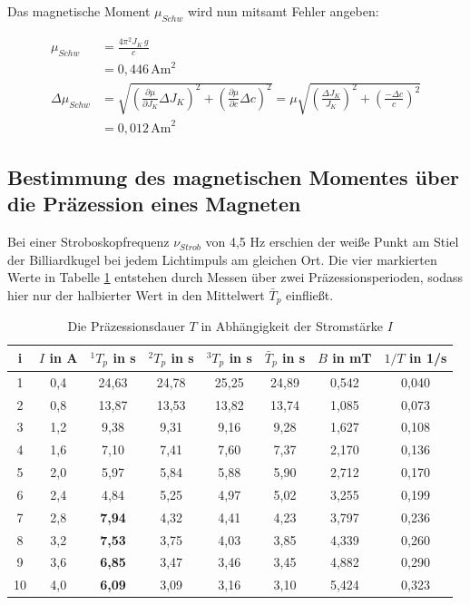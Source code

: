 Das magnetische Moment $\mu_{Schw}$ wird nun mitsamt Fehler angeben:

\begin{align}
 \nonumber
 \mu_{Schw} &= \frac{4 \pi^2 J_{K}\,g}{c} \\
 &= 0,446\, \text{Am}^2\\
 \nonumber
 \Delta \mu_{Schw} &= \sqrt{\left(\frac{\partial \mu}{\partial J_{K}}\Delta J_{K} \right)^2 + \left(\frac{\partial \mu}{\partial c}\Delta c \right)^2} = \mu \sqrt{\left( \frac{\Delta J_{K}}{J_{K}}\right)^2 + \left( \frac{-\Delta c}{c}\right)^2}\\
 &= 0,012 \, \text{Am}^2
\end{align}

\subsection[Ermittlung durch Präzission]{Bestimmung des magnetischen Momentes über die Präzession eines Magneten}
Bei einer Stroboskopfrequenz $\nu_{Strob}$ von 4,5 Hz erschien der weiße Punkt am Stiel der Billiardkugel bei jedem Lichtimpuls
am gleichen Ort. Die vier markierten Werte in Tabelle \ref{tabpräz} entstehen durch Messen über zwei Präzessionsperioden, sodass hier nur
der halbierter Wert in den Mittelwert $\bar T_{p}$ einfließt.

 \begin{table}[H]
  \begin{tabular}{c|c|c|c|c|c|c|c}
i & $I$ in A & $^1T_{p}$ in s & $^2T_{p}$ in s & $^3T_{p}$ in s & $\bar T_{p}$ in s & $B$ in mT & $1/T$ in 1/s\\
  \hline
1&	0,4&	24,63&	24,78&	25,25&	24,89&	0,542&	0,040 \\
2&	0,8&	13,87&	13,53&	13,82&	13,74&	1,085&	0,073\\
3&	1,2&	9,38&	9,31&	9,16&	9,28&	1,627&	0,108\\
4&	1,6&	7,10&	7,41&	7,60&	7,37&	2,170&	0,136\\
5&	2,0&	5,97&	5,84&	5,88&	5,90&	2,712&	0,170\\
6&	2,4&	4,84&	5,25&	4,97&	5,02&	3,255&	0,199\\
7&	2,8&	\bf{7,94}&	4,32&	4,41&	4,23&	3,797&	0,236\\
8&	3,2&	\bf{7,53}&	3,75&	4,03&	3,85&	4,339&	0,260\\
9&	3,6&	\bf{6,85}&	3,47&	3,46&	3,45&	4,882&	0,290\\
10&	4,0&	\bf{6,09}&	3,09&	3,16&	3,10&	5,424&	0,323\\

  \end{tabular}
\caption{Die Präzessionsdauer $T$ in Abhängigkeit der Stromstärke $I$}
  \label{tabpräz}
 \end{table}


